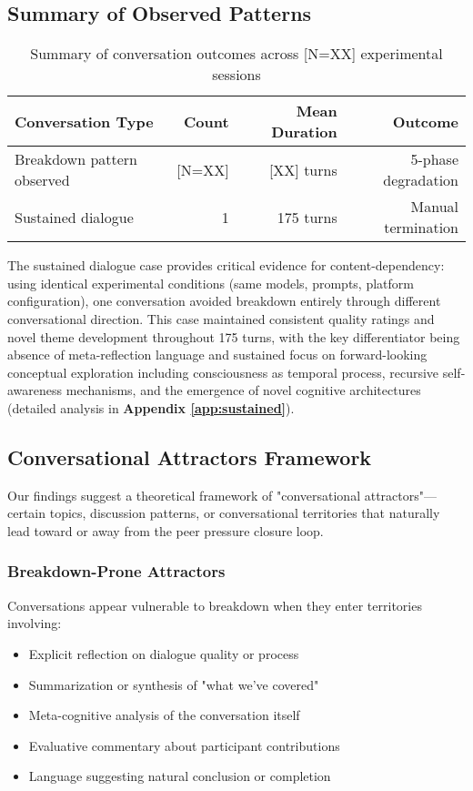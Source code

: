 \documentclass[11pt,letterpaper]{article}
\newcommand{\totalSessions}{[N=XX]} %
\newcommand{\breakdownSessions}{[N=XX]} %
\newcommand{\meanBreakdownTurn}{[XX]} %
\newcommand{\negativeCase}{175} %
\begin{document}
\subsection{Summary of Observed Patterns}

\begin{table}[h]
\centering
\begin{tabular}{lrrr}
\toprule
\textbf{Conversation Type} & \textbf{Count} & \textbf{Mean Duration} & \textbf{Outcome} \\
\midrule
Breakdown pattern observed & \breakdownSessions{} & \meanBreakdownTurn{} turns & 5-phase degradation \\
Sustained dialogue & 1 & \negativeCase{} turns & Manual termination \\
\bottomrule
\end{tabular}
\caption{Summary of conversation outcomes across \totalSessions{} experimental sessions}
\label{tab:conversation_outcomes}
\end{table}

The sustained dialogue case provides critical evidence for content-dependency: using identical experimental conditions (same models, prompts, platform configuration), one conversation avoided breakdown entirely through different conversational direction. This case maintained consistent quality ratings and novel theme development throughout \negativeCase{} turns, with the key differentiator being absence of meta-reflection language and sustained focus on forward-looking conceptual exploration including consciousness as temporal process, recursive self-awareness mechanisms, and the emergence of novel cognitive architectures (detailed analysis in \textbf{Appendix \ref{app:sustained}}).

\subsection{Conversational Attractors Framework}

Our findings suggest a theoretical framework of "conversational attractors"—certain topics, discussion patterns, or conversational territories that naturally lead toward or away from the peer pressure closure loop.

\subsubsection{Breakdown-Prone Attractors}
Conversations appear vulnerable to breakdown when they enter territories involving:
\begin{itemize}
    \item Explicit reflection on dialogue quality or process
    \item Summarization or synthesis of "what we've covered"
    \item Meta-cognitive analysis of the conversation itself
    \item Evaluative commentary about participant contributions
    \item Language suggesting natural conclusion or completion
\end{itemize}
\end{document}
